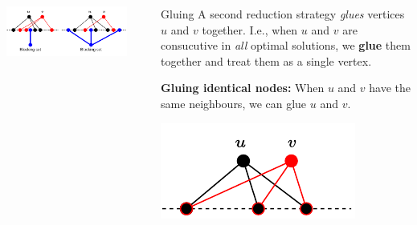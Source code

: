 \documentclass[final]{beamer}
\newlength{\sepwidth}
\newlength{\colwidth}
\newcommand{\separatorcolumn}{\begin{column}{\sepwidth}\end{column}}
\theoremstyle{remark}
\newcommand{\be}{\preceq}
\begin{document}
\begin{frame}[t]
\begin{columns}[t]
\begin{column}{\colwidth}


        \centering
        \includegraphics[scale=2]{fig/blocking-set.pdf}
    \end{column}

    \separatorcolumn

    \begin{column}{\colwidth}
      \begin{block}{Gluing}
        A second reduction strategy \emph{glues} vertices $u$ and $v$ together.
        I.e., when $u$ and $v$ are consucutive in \emph{all} optimal solutions,
        we \textbf{glue} them together and treat them as a single vertex.

        \textbf{Gluing identical nodes:}
        When $u$ and $v$ have the same neighbours, we can glue $u$ and $v$.

        \begin{center}
          \vspace{-2em}
        \includegraphics[scale=2]{fig/gluing.pdf}
        \end{center}


\end{block}
\end{column}
\end{columns}
\end{frame}
\end{document}
